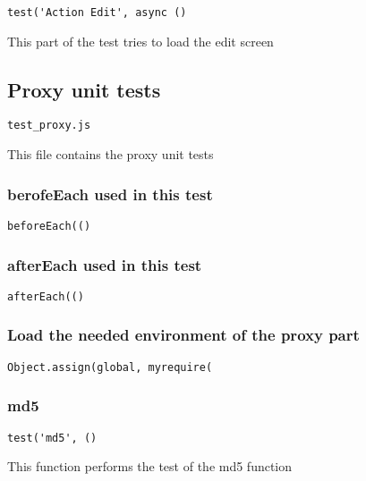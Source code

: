 \documentclass[a4paper]{article}
\begin{document}
\begin{lstlisting}
test('Action Edit', async ()
\end{lstlisting}

This part of the test tries to load the edit screen

\hypertarget{toc671}{}
\subsection{Proxy unit tests}

\begin{lstlisting}
test_proxy.js
\end{lstlisting}

This file contains the proxy unit tests

\hypertarget{toc672}{}
\subsubsection{berofeEach used in this test}

\begin{lstlisting}
beforeEach(()
\end{lstlisting}

\hypertarget{toc673}{}
\subsubsection{afterEach used in this test}

\begin{lstlisting}
afterEach(()
\end{lstlisting}

\hypertarget{toc674}{}
\subsubsection{Load the needed environment of the proxy part}

\begin{lstlisting}
Object.assign(global, myrequire(
\end{lstlisting}

\hypertarget{toc675}{}
\subsubsection{md5}

\begin{lstlisting}
test('md5', ()
\end{lstlisting}

This function performs the test of the md5 function
\end{document}
